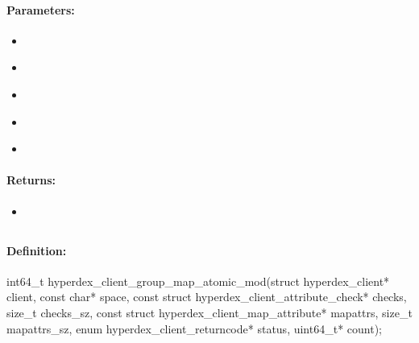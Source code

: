 \paragraph{Parameters:}
\begin{itemize}[noitemsep]
\item {}\\

\item {}\\

\item {}\\

\item {}\\

\item {}\\

\end{itemize}

\paragraph{Returns:}
\begin{itemize}[noitemsep]
\item {}\\

\end{itemize}

\pagebreak
\subsection{}
\label{api:c:group_map_atomic_mod}


\paragraph{Definition:}
\begin{ccode}
int64_t hyperdex_client_group_map_atomic_mod(struct hyperdex_client* client,
        const char* space,
        const struct hyperdex_client_attribute_check* checks, size_t checks_sz,
        const struct hyperdex_client_map_attribute* mapattrs, size_t mapattrs_sz,
        enum hyperdex_client_returncode* status,
        uint64_t* count);
\end{ccode}


